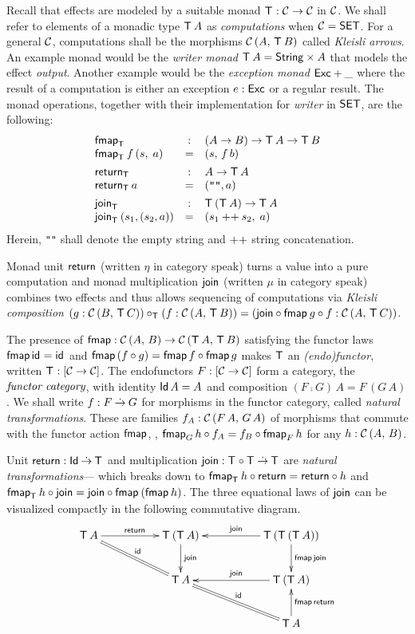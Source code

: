 \documentclass[acmsmall,review,anonymous]{acmart}\settopmatter{printfolios=true,printccs=false,printacmref=false}
\theoremstyle{remark}
\begin{document}
Recall that effects are modeled by a suitable monad $\T : \CC \to \CC$
in $\CC$.  We shall refer to elements of a monadic type $\T\,A$ as
\emph{computations} when $\CC = \SET$.  For a general $\CC$,
computations shall be the morphisms $\Hom A {\T\,B}$ called
\emph{Kleisli arrows}.
An example monad would be the \emph{writer monad}
$\T\,A = \String \times A$
that models the effect \emph{output}.
Another example would be the \emph{exception monad} $\Exc + \_$ where
the result of a computation is either an exception $e : \Exc$ or a
regular result.
The monad operations, together with
their implementation for \emph{writer} in $\SET$, are the following:
\[
\begin{array}{lcl}
\fmap[\T] & : & (A \to B) \to \T\,A \to \T\,B \\
\fmap[\T] f\, (s,\; a) & = & (s,\, f\, b)
\\[1ex]
\return[\T] & : & A \to \T\,A \\
\return[\T]\, a & = & (\verb|""|, a)
\\[1ex]
\join[\T] & : & \T\,(\T\,A) \to \T\,A \\
\join[\T]\,(s_1,(s_2,a)) & = & (s_1 \append s_2,\; a) \\
\end{array}
\]
Herein, \verb|""| shall denote the empty string and $\append$ string
concatenation.

Monad unit $\treturn$ (written $\eta$ in category speak) turns a value
into a pure computation and monad multiplication $\tjoin$ (written
$\mu$ in category speak) combines two effects and thus allows
sequencing of computations via \emph{Kleisli composition}
$ (g : \Hom B {\T\,C}) \comp_{\T} (f : \Hom A {\T\,B}) = (\tjoin \comp
  \fmap g \comp f : \Hom A {\T\,C})$.

The presence of $\tfmap : \Hom A B \to \Hom {\T\,A} {\T\,B}$
satisfying the functor laws $\tfmap\,\tid = \tid$ and
$\tfmap\,(f \circ g) = \tfmap\,f \circ \tfmap\,g$ makes $\T$ an
\emph{(endo)functor}, written $\T : [\CC \to \CC]$.  The
endofunctors $F : [\CC \to \CC]$ form a category, the
$\emph{functor category}$, with identity $\Id\,A = A$ and
composition $(F \comp G)\,A = F\,(G\,A)$.  We shall write
$f : F \todot G$ for morphisms in the functor category, called
\emph{natural transformations}.  These are families
$f_A : \Hom {F\,A} {G\,A}$ of morphisms that commute with the
functor action $\tfmap$, \ie,
$\fmap[G]h \comp f_A = f_B \comp \fmap[F]h$ for any $h : \Hom A B$.

Unit $\treturn : \Id \todot \T$ and multiplication
$\tjoin : \T \comp \T \todot \T$ are \emph{natural transformations}---%
which breaks down to $\fmap[\T] h \comp \treturn = \treturn \comp h$
and $\fmap[\T] h \comp \tjoin = \tjoin \comp \fmap{(\fmap h)}$.
%
The three equational
laws of $\tjoin$ can be visualized compactly in the following
commutative diagram.
\[
\xymatrix@C=12ex{
  \T\,A     \ar[r]^{\treturn} \ar@{=}[dr]^{\tid}
& \T\,(\T\,A) \ar[d]^{\tjoin}
& \T\,(\T\,(\T\,A)) \ar[l]_{\tjoin} \ar[d]^{\tfmap\,\tjoin}
\\
& \T\,A       \ar@{=}[dr]^{\tid}
& \T\,(\T\,A) \ar[l]_{\tjoin}
\\
&
& \T\,A \ar[u]_{\tfmap\,\treturn}
}
\]
\end{document}
